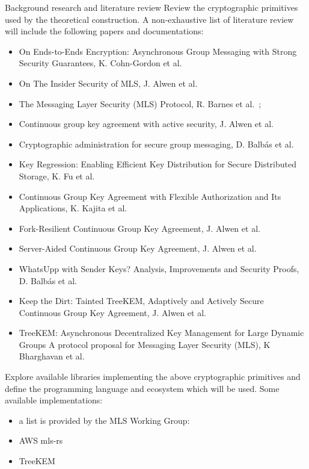 \documentclass[E]{BAMASA}
\begin{document}
\tasks
\begin{workpackage}{Background research and literature review}\label{wp:background}
Review the cryptographic primitives used by the theoretical construction. A non-exhaustive list of literature review will include the following papers and documentations:
\begin{itemize}
    \item On Ends-to-Ends Encryption: Asynchronous Group Messaging with Strong Security Guarantees, K. Cohn-Gordon et al.~\cite{CCS:CCGMM18}
    \item On The Insider Security of MLS, J. Alwen et al.~\cite{CCS:AHKM22}
    \item The Messaging Layer Security (MLS) Protocol, R. Barnes et al.~\cite{rfc9420};
    \item Continuous group key agreement with active security, J. Alwen et al.~\cite{TCC:ACJM20}
    \item  Cryptographic administration for secure
group messaging, D. Balb\'as et al.~\cite{USENIX:BalColVau23}
    \item Key Regression: Enabling Efficient Key Distribution for Secure Distributed Storage, K. Fu et al.~\cite{NDSS:FuKamKoh06}
    \item Continuous Group Key Agreement with Flexible Authorization and Its Applications, K. Kajita et al.~\cite{IWSPA:KEONO23}
    \item Fork-Resilient Continuous Group Key Agreement, J. Alwen et al.~\cite{C:AlwMulTse23}
    \item Server-Aided Continuous Group Key Agreement, J. Alwen et al.~\cite{CCS:AHKM22}
    \item WhatsUpp with Sender Keys? Analysis, Improvements and Security Proofs, D. Balb\'as et al.~\cite{AC:BalColGaj23}
    \item Keep the Dirt: Tainted TreeKEM, Adaptively and Actively Secure Continuous Group Key Agreement, J. Alwen et al.~\cite{SP:KPWKCCMYAP21}
    \item TreeKEM: Asynchronous Decentralized Key Management for Large Dynamic Groups A protocol proposal for Messaging Layer Security (MLS), K Bharghavan et al.~\cite{TreeKEM}
\end{itemize} 

Explore available libraries implementing the above cryptographic primitives and define the programming language and ecosystem which will be used. 
Some available implementations:
\begin{itemize}
    \item a list is provided by the MLS Working Group:~\cite{MLSWGimpl}
    \item AWS mls-rs~\cite{AWSMLSrs}
    \item TreeKEM~\cite{TreeKEMimpl}
\end{itemize}


\end{workpackage}
\end{document}
